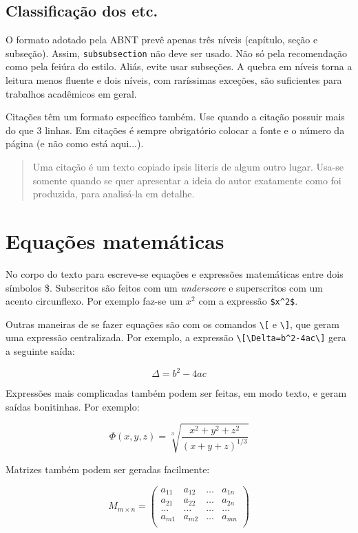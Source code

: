 \subsection{Classificação dos etc.}

O formato adotado pela ABNT prevê apenas três níveis (capítulo, seção e subseção). Assim, \texttt{subsubsection} não deve ser usado. Não só pela recomendação como pela feiúra do estilo. Aliás, evite usar subseções. A quebra em níveis torna a leitura menos fluente e dois níveis, com raríssimas exceções, são suficientes para trabalhos acadêmicos em geral.

Citações têm um formato específico também. Use quando a citação possuir mais do que 3 linhas. Em citações é sempre obrigatório colocar a fonte e o número da página (e não como está aqui...).

\begin{quote}
    Uma citação é um texto copiado ipsis literis de algum outro lugar. Usa-se somente quando se quer apresentar a ideia do autor exatamente como foi produzida, para analisá-la em detalhe.
\end{quote}


\section{Equações matemáticas}

No corpo do texto para escreve-se equações e expressões matemáticas entre dois símbolos \$. Subscritos são feitos com um \emph{underscore} e superscritos com um acento circunflexo. Por exemplo faz-se um $x^2$ com a expressão \verb"$x^2$".

Outras maneiras de se fazer equações são com os comandos \verb"\[" e \verb"\]", que geram uma expressão centralizada. Por exemplo, a expressão \verb"\[\Delta=b^2-4ac\]" gera a seguinte saída:

\[\Delta=b^2-4ac\]

Expressões mais complicadas também podem ser feitas, em modo texto, e geram saídas bonitinhas. Por exemplo:

\[\Phi(x,y,z)=\sqrt[3]{\frac{x^2+y^2+z^2}{(x+y+z)^{1/3}}}\]

Matrizes também podem ser geradas facilmente:

\[M_{m\times n}=\left( \begin{array}{cccc}
                           a_{11} & a_{12} & \ldots & a_{1n} \\
                           a_{21} & a_{22} & \ldots & a_{2n} \\
                           \ldots & \ldots & \ldots & \ldots \\
                           a_{m1} & a_{m2} & \ldots & a_{mn} \\
\end{array}\right)\]

